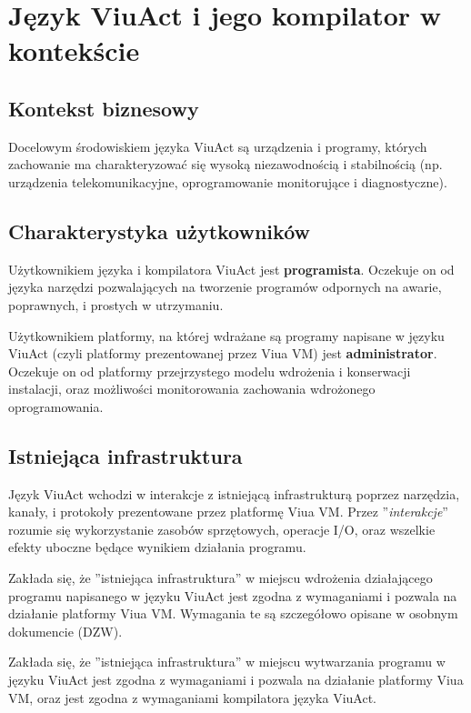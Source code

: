 \newpage
\section{Język ViuAct i jego kompilator w kontekście}

\subsection{Kontekst biznesowy}

Docelowym środowiskiem języka ViuAct są urządzenia i programy, których zachowanie ma charakteryzować się wysoką
niezawodnością i stabilnością (np. urządzenia telekomunikacyjne, oprogramowanie monitorujące i diagnostyczne).

\subsection{Charakterystyka użytkowników}

Użytkownikiem języka i kompilatora ViuAct jest \textbf{programista}. Oczekuje on od języka narzędzi
pozwalających na tworzenie programów odpornych na awarie, poprawnych, i prostych w utrzymaniu.

Użytkownikiem platformy, na której wdrażane są programy napisane w języku ViuAct (czyli platformy
prezentowanej przez Viua VM) jest \textbf{administrator}. Oczekuje on od platformy przejrzystego modelu
wdrożenia i konserwacji instalacji, oraz możliwości monitorowania zachowania wdrożonego oprogramowania.

\subsection{Istniejąca infrastruktura}

Język ViuAct wchodzi w interakcje z istniejącą infrastrukturą poprzez narzędzia, kanały, i protokoły prezentowane
przez platformę Viua VM. Przez ''\emph{interakcje}'' rozumie się wykorzystanie zasobów sprzętowych, operacje
I/O, oraz wszelkie efekty uboczne będące wynikiem działania programu.

Zakłada się, że ''istniejąca infrastruktura'' w miejscu wdrożenia działającego programu napisanego w języku
ViuAct jest zgodna z wymaganiami i pozwala na działanie platformy Viua VM. Wymagania te są szczegółowo opisane
w osobnym dokumencie (DZW).

Zakłada się, że ''istniejąca infrastruktura'' w miejscu wytwarzania programu w języku ViuAct jest zgodna z
wymaganiami i pozwala na działanie platformy Viua VM, oraz jest zgodna z wymaganiami kompilatora języka
ViuAct.

